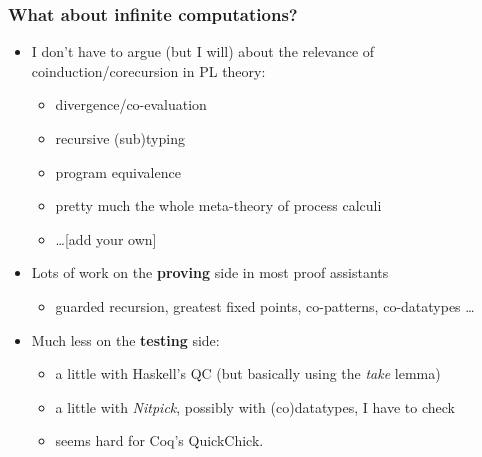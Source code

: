 \documentclass{beamer}
\begin{document}
\begin{frame}
  \frametitle{What about infinite computations?}
  \begin{itemize}
  \item I don't have to argue (but I will) about the relevance of
    coinduction/corecursion in PL theory:
    \begin{itemize}
    \item divergence/co-evaluation
    \item recursive (sub)typing
    \item program equivalence
    \item pretty much the whole meta-theory of process calculi
    \item \dots [add your own]
    \end{itemize}
  \item Lots of work on the \textbf{proving} side in most proof assistants
    \begin{itemize}
    \item guarded recursion, greatest fixed points, co-patterns, co-datatypes \dots
    \end{itemize}
  \item Much less on the \textbf{testing} side:
    \begin{itemize}
    \item a little with Haskell's QC (but basically using the \emph{take} lemma)
    \item a little with \emph{Nitpick}, possibly with (co)datatypes, I have to check
    \item seems hard for Coq's QuickChick.
    \end{itemize}

  \end{itemize}
\end{frame}
\end{document}
